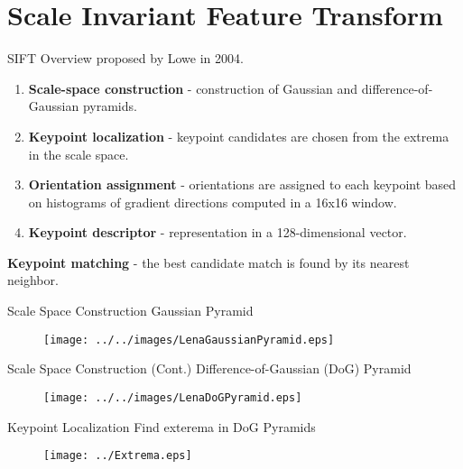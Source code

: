 \documentclass[
  size=12pt,
  paper=screen,
  mode=present,
  style=sailor
]{powerdot}
\begin{document}
\section[tocsection=true,slide=false]{Scale Invariant Feature Transform}

\begin{slide}{SIFT Overview}
proposed by Lowe  in 2004. 
\begin{enumerate}
\item \textbf{Scale-space construction} - construction of Gaussian and difference-of-Gaussian pyramids. 
\item \textbf{Keypoint localization} - keypoint candidates are chosen from the extrema in the scale space. 
\item \textbf{Orientation assignment} - orientations are assigned to each keypoint based on histograms of gradient directions computed in a 16x16 window. 
\item \textbf{Keypoint descriptor} - representation in a 128-dimensional vector.
\end{enumerate}

\noindent\textbf{Keypoint matching} - the best candidate match is found by its nearest neighbor.
\end{slide}

\begin{slide}{Scale Space Construction}
  Gaussian Pyramid
  \begin{figure}
    \begin{center}
      \texttt{[image: ../../images/LenaGaussianPyramid.eps]}
    \end{center}
  \end{figure}
\end{slide}

\begin{slide}{Scale Space Construction (Cont.)}
  Difference-of-Gaussian (DoG) Pyramid
  \begin{figure}
    \begin{center}
      \texttt{[image: ../../images/LenaDoGPyramid.eps]}
    \end{center}
  \end{figure}
\end{slide}

\begin{slide}{Keypoint Localization}
  Find exterema in DoG Pyramids
  \begin{figure}
    \begin{center}
      \texttt{[image: ../Extrema.eps]}
    \end{center}\label{Fi:EXT}
  \end{figure}
\end{slide}
\end{document}
